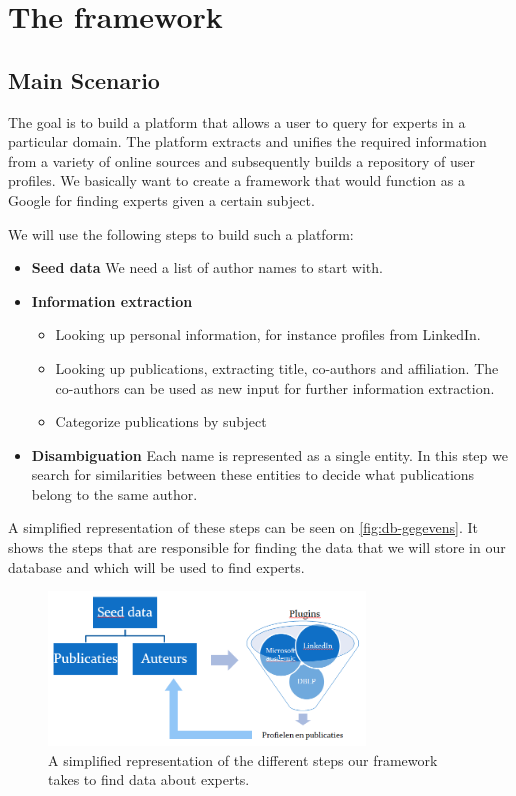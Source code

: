 \chapter{The framework}

\section{Main Scenario}

The goal is to build a platform that allows a user to query for experts in a particular domain. The platform extracts and unifies the required information from a variety of online sources and subsequently builds a repository of user profiles. We basically want to create a framework that would function as a Google for finding experts given a certain subject.

We will use the following steps to build such a platform:


\begin{itemize}
	\item \textbf{Seed data} We need a list of author names to start with.
	\item \textbf{Information extraction}
		\begin{itemize}
			\item Looking up personal information, for instance profiles from LinkedIn.
			\item Looking up publications, extracting title, co-authors and affiliation. The co-authors can be used as new input for further information extraction.
			\item Categorize publications by subject
		\end{itemize}
	\item \textbf{Disambiguation} Each name is represented as a single entity. In this step we search for similarities between these entities to decide what publications belong to the same author.
\end{itemize}

A simplified representation of these steps can be seen on \autoref{fig:db-gegevens}. It shows the steps that are responsible for finding the data that we will store in our database and which will be used to find experts.

\begin{figure}[htbp]
	\centering
		\includegraphics[width=0.75\textwidth]{fig/database-gegevens.png}
	\caption{A simplified representation of the different steps our framework takes to find data about experts.}
	\label{fig:db-gegevens}
\end{figure}

